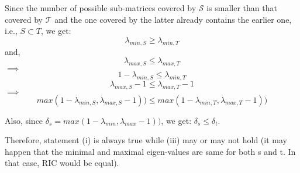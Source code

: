 \documentclass{article}
\begin{document}
\begin{enumerate}
    Since the number of possible sub-matrices covered by $\mathcal{S}$ is smaller than that covered by $\mathcal{T}$ and the one covered by the latter already contains the earlier one, i.e., $S \subset T$, we get:
    \[ 
        \lambda_{min,S} \geq \lambda_{min,T}
    \]
and,
    \[ 
        \lambda_{max,S} \leq \lambda_{max,T}
    \]
    $\implies$
    \[
        1-\lambda_{min,S} \leq \lambda_{min,T}
    \]
    \[
        \lambda_{max,S}-1 \leq \lambda_{max,T}-1
    \]
    $\implies$
    \[
        max(1-\lambda_{min,S}, \lambda_{max,S}-1)) \leq max(1-\lambda_{min,T}, \lambda_{max,T}-1))
    \]
    
    Also, since $\delta_s = max(1-\lambda_{min}, \lambda_{max}-1))$, we get:
    $\delta_{s} \leq \delta_{t}$.

    Therefore, statement (i) is always true while (iii) may or may not hold (it may happen that the minimal and maximal eigen-values are same for both s and t. In that case, RIC would be equal).


        

        
\end{enumerate}
\end{document}
